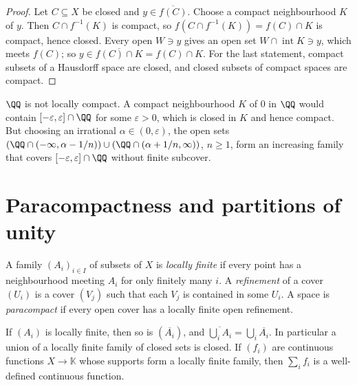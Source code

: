 \begin{proof}
Let $C \subseteq X$ be closed and $y \in \overline{f(C)}$. Choose a compact neighbourhood $K$ of $y$. Then $C \cap f^{-1}(K)$ is compact, so
$f(C \cap f^{-1}(K)) = f(C) \cap K$ is compact, hence closed. Every open $W \ni y$ gives an open set $W \cap \operatorname{int} K \ni y$, which meets $f(C)$;
so $y \in \overline{f(C) \cap K} = f(C) \cap K$. For the last statement, compact subsets of a Hausdorff space are closed, and closed subsets of compact spaces are
compact.
\end{proof}

\begin{counterexample}\label{general-topology:counterexample-q-not-locally-compact}
$\QQ$ is not locally compact. A compact neighbourhood $K$ of $0$ in $\QQ$ would contain $[-\varepsilon, \varepsilon] \cap \QQ$ for some $\varepsilon > 0$,
which is closed in $K$ and hence compact. But choosing an irrational $\alpha \in (0, \varepsilon)$, the open sets $(\QQ \cap (-\infty, \alpha - 1/n)) \cup (\QQ \cap (\alpha + 1/n, \infty))$, $n \geq 1$, form an increasing family that
covers $[-\varepsilon, \varepsilon] \cap \QQ$ without finite subcover.
\end{counterexample}

\section{Paracompactness and partitions of unity}\label{general-topology:section-paracompactness}

\begin{definition}\label{general-topology:definition-paracompact}
A family $(A_i)_{i \in I}$ of subsets of $X$ is \emph{locally finite} if every point has a neighbourhood meeting $A_i$ for only finitely many $i$. A
\emph{refinement} of a cover $(U_i)$ is a cover $(V_j)$ such that each $V_j$ is contained in some $U_i$. A space is \emph{paracompact} if every open cover has
a locally finite open refinement.
\end{definition}

\begin{lemma}\label{general-topology:lemma-locally-finite}
If $(A_i)$ is locally finite, then so is $(\overline{A_i})$, and $\overline{\bigcup_i A_i} = \bigcup_i \overline{A_i}$. In particular a union of a locally finite
family of closed sets is closed. If $(f_i)$ are continuous functions $X \to \mathbb{K}$ whose supports form a locally finite family, then $\sum_i f_i$ is a
well-defined continuous function.
\end{lemma}

